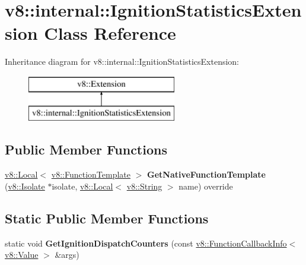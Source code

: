 \hypertarget{classv8_1_1internal_1_1_ignition_statistics_extension}{}\section{v8\+:\+:internal\+:\+:Ignition\+Statistics\+Extension Class Reference}
\label{classv8_1_1internal_1_1_ignition_statistics_extension}
Inheritance diagram for v8\+:\+:internal\+:\+:Ignition\+Statistics\+Extension\+:\begin{figure}[H]
\begin{center}
\leavevmode
\includegraphics[height=2.000000cm]{classv8_1_1internal_1_1_ignition_statistics_extension}
\end{center}
\end{figure}
\subsection*{Public Member Functions}
\begin{DoxyCompactItemize}
\item 
\hyperlink{classv8_1_1_local}{v8\+::\+Local}$<$ \hyperlink{classv8_1_1_function_template}{v8\+::\+Function\+Template} $>$ {\bfseries Get\+Native\+Function\+Template} (\hyperlink{classv8_1_1_isolate}{v8\+::\+Isolate} $\ast$isolate, \hyperlink{classv8_1_1_local}{v8\+::\+Local}$<$ \hyperlink{classv8_1_1_string}{v8\+::\+String} $>$ name) override\hypertarget{classv8_1_1internal_1_1_ignition_statistics_extension_a036370007e678bb61c1d64f2bf83c55b}{}\label{classv8_1_1internal_1_1_ignition_statistics_extension_a036370007e678bb61c1d64f2bf83c55b}

\end{DoxyCompactItemize}
\subsection*{Static Public Member Functions}
\begin{DoxyCompactItemize}
\item 
static void {\bfseries Get\+Ignition\+Dispatch\+Counters} (const \hyperlink{classv8_1_1_function_callback_info}{v8\+::\+Function\+Callback\+Info}$<$ \hyperlink{classv8_1_1_value}{v8\+::\+Value} $>$ \&args)\hypertarget{classv8_1_1internal_1_1_ignition_statistics_extension_a19a01d41059e9ab8539e1fdfdfdfb554}{}\label{classv8_1_1internal_1_1_ignition_statistics_extension_a19a01d41059e9ab8539e1fdfdfdfb554}

\end{DoxyCompactItemize}
